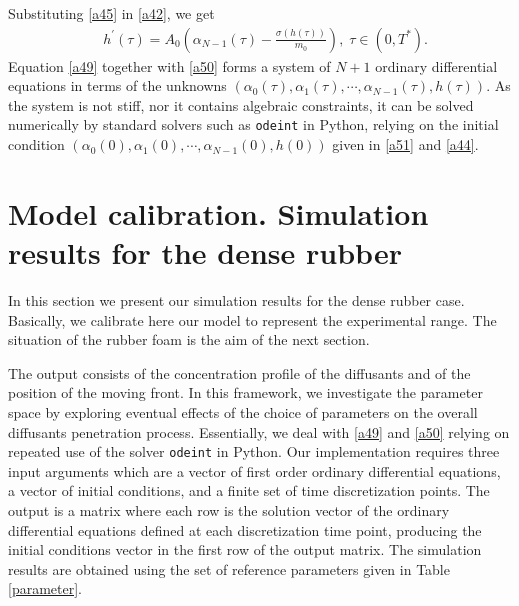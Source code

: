 \documentclass{article}
\begin{document}
Substituting \eqref{a45} in \eqref{a42}, we get
\begin{align}
\label{a50}  &h^{\prime}(\tau) = A_0\left(\alpha_{N-1}(\tau)-\frac{\sigma(h(\tau))}{m_0}\right),\; \tau\in(0, T^*).
\end{align}
Equation \eqref{a49} together with \eqref{a50} forms a system of $N+1$ ordinary differential equations in terms of the unknowns
$(\alpha_0(\tau), \alpha_1(\tau), \cdots, \alpha_{N-1}(\tau), h(\tau))$. As the system is  not stiff, nor it contains algebraic constraints, it  can be solved numerically by  standard solvers such as  \texttt{odeint} in Python, relying on the initial condition $(\alpha_0(0),\alpha_1(0), \cdots, \alpha_{N-1}(0), h(0))$ given in  \eqref{a51} and \eqref{a44}. \\

\section{Model calibration. Simulation results for the dense rubber}\label{simulation}

In this section we present our simulation results for the dense rubber case. Basically, we calibrate here our model to represent the experimental range. The situation of the rubber foam is the aim of the next section.

The output consists of the concentration profile of the diffusants and of the position of the moving front. In this framework, we  investigate the parameter space by exploring eventual effects of the choice of parameters on the overall diffusants penetration process. Essentially, we deal with  \eqref{a49} and \eqref{a50} relying on repeated use of the solver \texttt{odeint} in Python. 
Our implementation requires three input arguments which are a vector of first order ordinary differential equations, a vector of initial conditions, and  a finite set of time discretization points. The output is a matrix where  each row is the solution vector of the ordinary differential equations defined at each discretization time point, producing the initial conditions vector in the first row of the output matrix. 
The simulation results are obtained using the set of reference parameters given in Table \ref{parameter}. 
\end{document}
